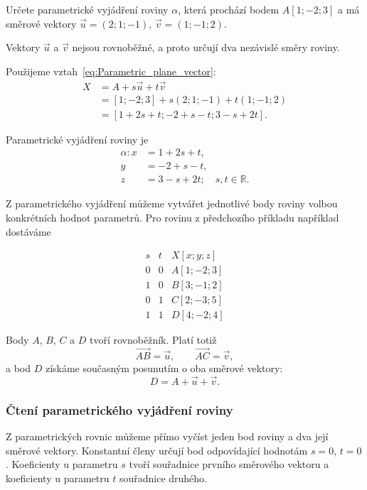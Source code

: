 \begin{example}
    \label{exa:Parametric_plane_point_vectors}

    Určete parametrické vyjádření roviny $\alpha$, která prochází bodem
    $A[1;-2;3]$ a má směrové vektory $\vec{u}=(2;1;-1)\text{, } \vec{v}=(1;-1;2)$.

    Vektory $\vec{u}$ a $\vec{v}$ nejsou rovnoběžné, a proto určují
    dva nezávislé směry roviny.

    Použijeme vztah~\eqref{eq:Parametric_plane_vector}:
    \begin{align*}
        X
        &=A+s\vec{u}+t\vec{v}\\
        &=[1;-2;3]+s(2;1;-1)+t(1;-1;2)\\
        &=[1+2s+t;-2+s-t;3-s+2t].
    \end{align*}

    Parametrické vyjádření roviny je
    \[
        \begin{aligned}
            \alpha: x&=1+2s+t,\\
            y&=-2+s-t,\\
            z&=3-s+2t; \quad s,t\in\mathbb{R}.
        \end{aligned}
    \]
\end{example}

Z parametrického vyjádření můžeme vytvářet jednotlivé body roviny
volbou konkrétních hodnot parametrů. Pro rovinu z předchozího příkladu
například dostáváme

\[
    \begin{array}{c|c|c}
        s & t & X[x;y;z]\\
        \hline
        0 & 0 & A[1;-2;3]\\
        1 & 0 & B[3;-1;2]\\
        0 & 1 & C[2;-3;5]\\
        1 & 1 & D[4;-2;4]
    \end{array}
\]

Body $A$, $B$, $C$ a $D$ tvoří rovnoběžník. Platí totiž
\[
    \overrightarrow{AB}=\vec{u},
    \qquad
    \overrightarrow{AC}=\vec{v},
\]
a bod $D$ získáme současným posunutím o oba směrové vektory:
\[
    D=A+\vec{u}+\vec{v}.
\]


\subsubsection{Čtení parametrického vyjádření roviny}
\label{subsubsec:Reading_parametric_plane}

Z parametrických rovnic můžeme přímo vyčíst jeden bod roviny a dva
její směrové vektory. Konstantní členy určují bod odpovídající hodnotám
$s=0$, $t=0$. Koeficienty u parametru $s$ tvoří souřadnice prvního
směrového vektoru a koeficienty u parametru $t$ souřadnice druhého.

